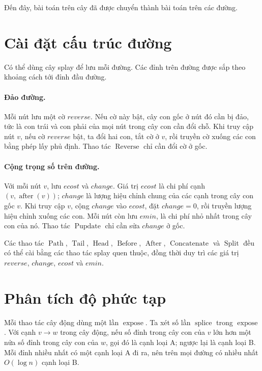 \documentclass[11pt]{article}
\begin{document}
Đến đây, bài toán trên cây đã được chuyển thành bài toán trên các đường.

\section{Cài đặt cấu trúc đường}

Có thể dùng cây splay để lưu mỗi đường. Các đỉnh trên đường được sắp theo
khoảng cách tới đỉnh đầu đường.

\paragraph{Đảo đường.}
Mỗi nút lưu một cờ \(\mathit{reverse}\). Nếu cờ này bật, cây con gốc ở nút đó
cần bị đảo, tức là con trái và con phải của mọi nút trong cây con cần đổi
chỗ. Khi truy cập nút \(v\), nếu cờ \(\mathit{reverse}\) bật, ta đổi hai con,
tắt cờ ở \(v\), rồi truyền cờ xuống các con bằng phép lấy phủ định. Thao tác
\(\operatorname{Reverse}\) chỉ cần đổi cờ ở gốc.

\paragraph{Cộng trọng số trên đường.}
Với mỗi nút \(v\), lưu \(\mathit{ecost}\) và \(\mathit{change}\). Giá trị
\(\mathit{ecost}\) là chi phí cạnh \((v,\operatorname{after}(v))\);
\(\mathit{change}\) là lượng hiệu chỉnh chung của các cạnh trong cây con gốc
\(v\). Khi truy cập \(v\), cộng \(\mathit{change}\) vào
\(\mathit{ecost}\), đặt \(\mathit{change}=0\), rồi truyền lượng hiệu chỉnh
xuống các con. Mỗi nút còn lưu \(\mathit{emin}\), là chi phí nhỏ nhất trong
cây con của nó. Thao tác \(\operatorname{Pupdate}\) chỉ cần sửa
\(\mathit{change}\) ở gốc.

Các thao tác \(\operatorname{Path}\), \(\operatorname{Tail}\),
\(\operatorname{Head}\), \(\operatorname{Before}\), \(\operatorname{After}\),
\(\operatorname{Concatenate}\) và \(\operatorname{Split}\) đều có thể cài bằng
các thao tác splay quen thuộc, đồng thời duy trì các giá trị
\(\mathit{reverse}\), \(\mathit{change}\), \(\mathit{ecost}\) và
\(\mathit{emin}\).

\section{Phân tích độ phức tạp}

Mỗi thao tác cây động dùng một lần \(\operatorname{expose}\). Ta xét số lần
\(\operatorname{splice}\) trong \(\operatorname{expose}\). Với cạnh \(v\to w\)
trong cây động, nếu số đỉnh trong cây con của \(v\) lớn hơn một nửa số đỉnh
trong cây con của \(w\), gọi đó là cạnh loại A; ngược lại là cạnh loại B.
Mỗi đỉnh nhiều nhất có một cạnh loại A đi ra, nên trên mọi đường có nhiều
nhất \(O(\log n)\) cạnh loại B.
\end{document}
